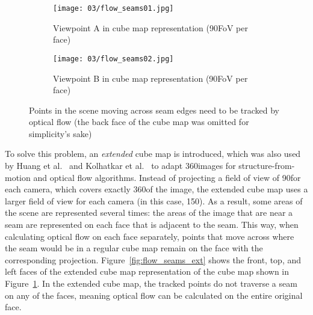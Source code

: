 \begin{figure}
\centering
    \hfill
    \begin{subfigure}[t]{0.5\textwidth}            
            \centering
            \texttt{[image: 03/flow\_seams01.jpg]}
            \caption{Viewpoint A in cube map representation (90\degree FoV per face)}
    \end{subfigure}%
    \hfill
    \begin{subfigure}[t]{0.5\textwidth}
            \centering
            \texttt{[image: 03/flow\_seams02.jpg]}
            \caption{Viewpoint B in cube map representation (90\degree FoV per face)}
    \end{subfigure}
    \hfill
    \hfill
  \caption[Points traversing seams in the cube map]{Points in the scene moving across seam edges need to be tracked by optical flow (the back face of the cube map was omitted for simplicity's sake)} \label{fig:flow_seams}
\end{figure}

To solve this problem, an \emph{extended} cube map is introduced, which was also used by Huang et al.\ \cite{6dof} and Kolhatkar et al.\ \cite{360flowblending} to adapt 360\degree images for structure-from-motion and optical flow algorithms. Instead of projecting a field of view of 90\degree for each camera, which covers exactly 360\degree of the image, the extended cube map uses a larger field of view for each camera (in this case, 150\degree). As a result, some areas of the scene are represented several times: the areas of the image that are near a seam are represented on each face that is adjacent to the seam. This way, when calculating optical flow on each face separately, points that move across where the seam would be in a regular cube map remain on the face with the corresponding projection. Figure~\ref{fig:flow_seams_ext} shows the front, top, and left faces of the extended cube map representation of the cube map shown in Figure~\ref{fig:flow_seams}. In the extended cube map, the tracked points do not traverse a seam on any of the faces, meaning optical flow can be calculated on the entire original face.

